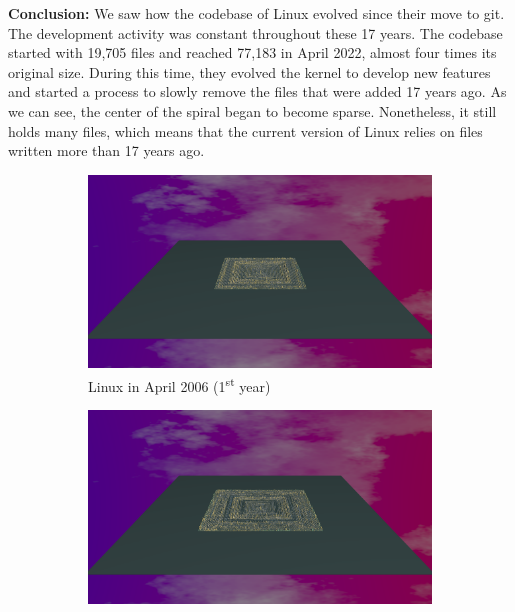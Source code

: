 \bigbreak
\noindent
\textbf{Conclusion:}
 We saw how the codebase of Linux evolved since their move to git. The development activity was constant throughout these 17 years. The codebase started with 19,705 files and reached 77,183 in April 2022, almost four times its original size. During this time, they evolved the kernel to develop new features and started a process to slowly remove the files that were added 17 years ago. As we can see, the center of the spiral began to become sparse. Nonetheless, it still holds many files, which means that the current version of Linux relies on files written more than 17 years ago. 


\begin{figure}[ht]
    \begin{subfigure}{0.48\textwidth}
        \includegraphics[width=\linewidth]{Linux/Animation001.png}
        \caption{Linux in April 2006 (1\textsuperscript{st} year)} 
        \label{fig:Linux_V7_S1}
    \end{subfigure}\hspace*{\fill}
    \begin{subfigure}{0.48\textwidth}
        \includegraphics[width=\linewidth]{Linux/Animation004.png}

\end{subfigure}
\end{figure}
